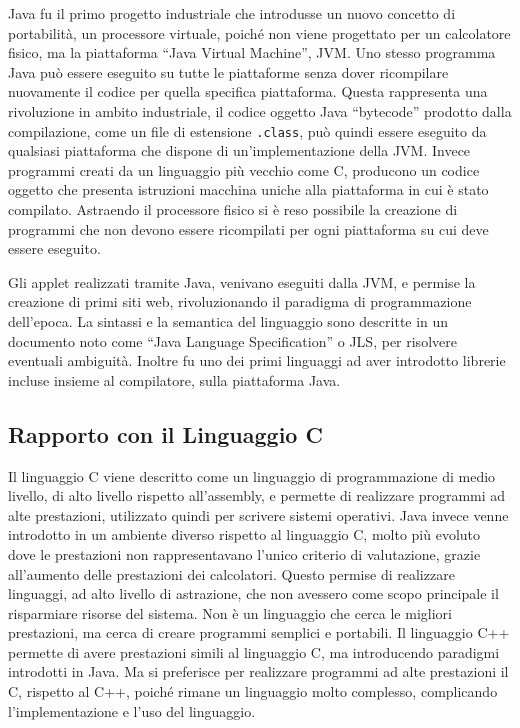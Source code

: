 \documentclass{article}
\numberwithin{equation}{subsection}
\begin{document}
Java fu il primo progetto industriale che introdusse un nuovo concetto di portabilità, un processore virtuale, poiché non viene progettato per un 
calcolatore fisico, ma la piattaforma ``Java Virtual Machine'', JVM. Uno stesso programma Java può essere eseguito su tutte le piattaforme senza dover ricompilare 
nuovamente il codice per quella specifica piattaforma. Questa rappresenta una rivoluzione in ambito industriale, il codice oggetto Java ``bytecode'' prodotto dalla 
compilazione, come un file di estensione \verb|.class|, può quindi essere eseguito da qualsiasi piattaforma che dispone di un'implementazione della 
JVM. Invece programmi creati da un linguaggio più vecchio come C, producono un codice oggetto che presenta istruzioni macchina uniche alla piattaforma in cui è stato 
compilato. Astraendo il processore fisico si è reso possibile la creazione di programmi che non devono essere ricompilati per ogni piattaforma su cui deve essere eseguito. 

Gli applet realizzati tramite Java, venivano eseguiti dalla JVM, e permise la creazione di primi siti web, rivoluzionando il paradigma di programmazione dell'epoca. 
La sintassi e la semantica del linguaggio sono descritte in un documento noto come ``Java Language Specification'' o JLS, per risolvere eventuali ambiguità. Inoltre fu uno dei primi 
linguaggi ad aver introdotto librerie incluse insieme al compilatore, sulla piattaforma Java. 

\subsection{Rapporto con il Linguaggio C}

Il linguaggio C viene descritto come un linguaggio di programmazione di medio livello, di alto livello rispetto all'assembly, e permette di realizzare programmi ad alte 
prestazioni, utilizzato quindi per scrivere sistemi operativi. Java invece venne introdotto in un ambiente diverso rispetto al linguaggio C, molto più evoluto dove le prestazioni non 
rappresentavano l'unico criterio di valutazione, grazie all'aumento delle prestazioni dei calcolatori. Questo permise di realizzare linguaggi, ad alto livello di astrazione, che non avessero 
come scopo principale il risparmiare risorse del sistema.
Non è un linguaggio che cerca le migliori prestazioni, ma cerca di creare programmi semplici e portabili. Il linguaggio 
C++ permette di avere prestazioni simili al linguaggio C, ma introducendo paradigmi introdotti in Java. Ma si preferisce per realizzare programmi ad alte prestazioni il 
C, rispetto al C++, poiché rimane un linguaggio molto complesso, complicando l'implementazione e l'uso del linguaggio. 
\end{document}
